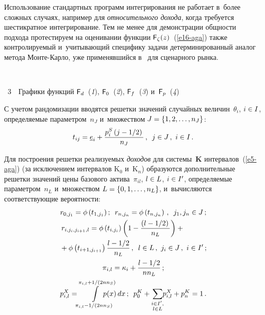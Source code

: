 \begin{multicols}{2}
  Использование стандартных программ интегрирования не работает в~более 
сложных случаях, например для \textit{относительного дохода}, когда 
требуется шестикратное интегрирование. Тем не менее для демонстрации 
общности подхода протестируем на оценивании функции  
${\sf F}_\zeta(z)$~(\ref{e16-aga}) также конт\-ро\-ли\-ру\-емый и~учитывающий 
специфику задачи детерминированный аналог метода Мон\-те-Кар\-ло, уже 
применявшийся в~\cite{4-aga} для сценарного рынка.

 { \begin{center}  %
 \vspace*{9pt}
\mbox{%
 \epsfxsize=78.856mm 
 }


\vspace*{6pt}


\noindent
{{\figurename~3}\ \ \small{Графики функций  ${\sf F}_d$~(\textit{1}),
 ${\sf F}_0$~(\textit{2}),
${\sf F}_f$~(\textit{3}) и~${\sf F}_p$~(\textit{4})}}
\end{center}
}


\addtocounter{figure}{1}


  
  С учетом рандомизации вводятся решетки значений случайных 
величин~$\theta_i$, $i\hm\in I$, определяемые параметром~$n_J$ и~множеством 
$J\hm = \{1, 2, \ldots , n_J\}$: 
  \begin{equation}
  t_{ij} =\underline{e}_i+\fr{p_i^S\left( j-1/2\right)}{n_J}\,,\enskip j\in J\,,\ i\in I\,.
  \label{e19-aga}
  \end{equation}
  
  Для построения решетки реализуемых \textit{доходов} для 
системы~$\mathbf{K}$ интервалов~(\ref{e5-aga}) (за исключением интервалов 
$\mathrm{K}_0$ и~$\mathrm{K}_n$) образуются дополнительные решетки 
значений цены базового актива~$\pi_{il}$, $l\hm\in L$, $i\hm\in I^\prime$, 
определяемые параметром~$n_L$ и~множеством $L\hm = \{0, 1, \ldots , n_L\}$, 
и~вычисляются соответ\-ст\-ву\-ющие вероятности: 
  \begin{gather*}
  r_{0,j_1} =\phi\left( t_{1,j_1}\right);\enskip 
  r_{n,j_n}=\phi\left( t_{n,j_n}\right)\,,\enskip j_1, j_n\in 
J\,;\\
 \hspace*{-10mm}r_{i,j_i, j_{i+1},l}=\phi\left( t_{i,j_i}\right) \left( 1-\fr{\left( l-
1/2\right)}{n_L}\right)+{}\\
{}+\phi\left( t_{i+1, j_{i+1}}\right) \fr{l-1/2}{n_L}\,,\enskip 
l\in L\,,\ j_i\in J\,,\ i\in I^{\prime}\,;\\
  \pi_{i,l} = \kappa_i+\fr{l-1/2}{nn_L}\,;\\
  p^X_{i,l}  =\!\!\int\limits_{\pi_{i,l}-1/(2nn_S)}^{\pi_{i,l}+1/(2nn_S)}
   \hspace*{-6mm}p(x)\,dx\,;\enskip
  p_0^K +
  \sum\limits_{\substack{{i\in I^\prime,}\\ {l\in L}}} \!\! p^X_{i,l} +p_n^K=1\,.
  \end{gather*}
  


\end{multicols}
